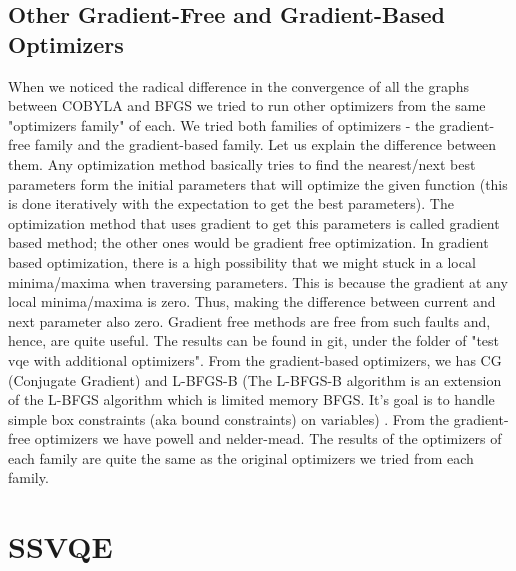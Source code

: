 \documentclass[12pt, a4paper]{article}
\begin{document}
    \subsection{Other Gradient-Free and Gradient-Based Optimizers}
    When we noticed the radical difference in the convergence of all the graphs between COBYLA and BFGS we tried to run other optimizers from the same "optimizers family" of each. We tried both families of optimizers - the gradient-free family and the gradient-based family.
    Let us explain the difference between them. Any optimization method basically tries to find the nearest/next best parameters form the initial parameters that will optimize the given function (this is done iteratively with the expectation to get the best parameters).
    The optimization method that uses gradient to get this parameters is called gradient based method; the other ones would be gradient free optimization.
    In gradient based optimization, there is a high possibility that we might stuck in a local minima/maxima when traversing parameters. This is because the gradient at any local minima/maxima is zero. Thus, making the difference between current and next parameter also zero. Gradient free methods are free from such faults and, hence, are quite useful.
    The results can be found in git, under the folder of "test vqe with additional optimizers".
    From the gradient-based optimizers, we has CG (Conjugate Gradient) and L-BFGS-B (The L-BFGS-B algorithm is an extension of the L-BFGS algorithm which is limited memory BFGS. It's goal is to handle simple box constraints (aka bound constraints) on variables) \cite{zhu1997algorithm}. From the gradient-free optimizers we have powell and nelder-mead. The results of the optimizers of each family are quite the same as the original optimizers we tried from each family.


    \section{SSVQE}
\end{document}
